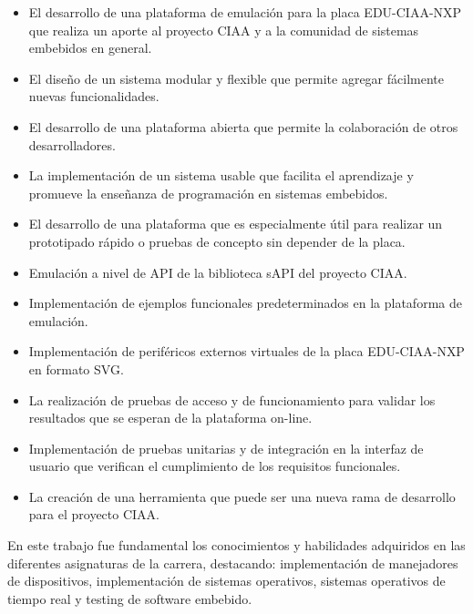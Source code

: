 \begin{itemize}

\item El desarrollo de una plataforma de emulación para la placa EDU-CIAA-NXP que realiza un aporte al proyecto CIAA y a la comunidad de sistemas
embebidos en general.

\item El diseño de un sistema modular y flexible que permite agregar fácilmente nuevas
funcionalidades.

\item El desarrollo de una plataforma abierta que permite la colaboración de otros desarrolladores.

\item La implementación de un sistema usable que facilita el aprendizaje y promueve la enseñanza de
programación en sistemas embebidos.

\item El desarrollo de una plataforma que es especialmente útil para realizar un prototipado rápido o pruebas de concepto sin depender de la placa.

\item Emulación a nivel de API de la biblioteca sAPI del proyecto CIAA.

\item Implementación de ejemplos funcionales predeterminados en la plataforma de emulación.

\item Implementación de periféricos externos virtuales de la placa EDU-CIAA-NXP en formato SVG.

\item La realización de pruebas de acceso y de funcionamiento para validar los resultados que se esperan de la plataforma on-line.

\item Implementación de pruebas unitarias y de integración en la interfaz de usuario que verifican el cumplimiento de los requisitos funcionales.

\item La creación de una herramienta que puede ser una nueva rama de desarrollo para el proyecto CIAA.

\end{itemize}

En este trabajo fue fundamental los conocimientos y habilidades adquiridos en las diferentes asignaturas de la carrera,  destacando: implementación de manejadores de dispositivos, implementación de sistemas operativos, sistemas operativos de tiempo real y testing de software embebido.

